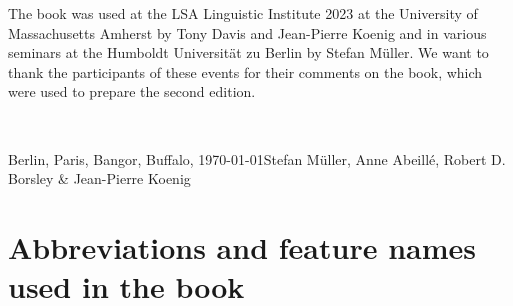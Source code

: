 \begin{refsection}
The book was used at the LSA Linguistic Institute 2023 at the University of Massachusetts Amherst by
Tony Davis and Jean-Pierre Koenig and in various seminars at the Humboldt
Universität zu Berlin by Stefan Müller. We want to thank the participants of these events for their
comments on the book, which were used to prepare the second edition.

~\medskip

\noindent
Berlin, Paris, Bangor, Buffalo, \today\hfill Stefan Müller, Anne Abeillé, Robert D. Borsley \& Jean-​Pierre Koenig





\printbibliography[heading=subbibliography]

\section{Abbreviations and feature names used in the book}


\end{refsection}
